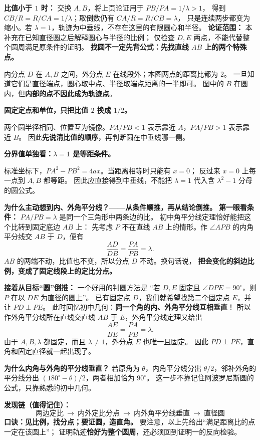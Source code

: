 \begin{explanationbox}
\textbf{比值小于 $1$ 时：} 交换 $A,B$，将上页论证用于 $PB/PA=1/\lambda>1$，
得到 $CB/R=R/CA=1/\lambda$；取倒数仍有 $CA/R=R/CB=\lambda$，
只是连续两步都变为缩小。若 $\lambda=1$，轨迹为中垂线，不存在这里的有限圆心和半径。
\textbf{论证范围：} 本补充在已知直径圆之后解释圆心与半径的比例；
仅检查 $D,E$ 两点，不能代替整个圆周满足原条件的证明。
\tcbbreak
\textbf{找圆不一定先背公式：先找直线 $AB$ 上的两个特殊点。}

内分点 $D$ 在 $A,B$ 之间，外分点 $E$ 在线段外；本图两点的距离比都为 $2$。
一旦知道它们是直径端点，圆心取中点、半径取端点距离的一半即可。
图中的 $B$ 在圆内，但\textbf{内部的点不因此成为轨迹点}。

\tcbbreak
\textbf{固定定点和单位，只把比值 $2$ 换成 $1/2$。}

两个圆半径相同、位置互为镜像。$PA/PB<1$ 表示靠近 $A$，$PA/PB>1$ 表示靠近 $B$。
因此\textbf{先说清比值的顺序}，再判断圆在中垂线哪一侧。

\tcbbreak
\textbf{分界值单独看：$\lambda=1$ 是等距条件。}

标准坐标下，$PA^2-PB^2=4ax$。当距离相等时只能有 $x=0$；
反过来 $x=0$ 上每一点到 $A,B$ 都等距。
因此应直接得到中垂线，不能把 $\lambda=1$ 代入含 $\lambda^2-1$ 分母的圆公式。

\tcbbreak
\textbf{为什么主动想到内、外角平分线？——从条件顺推，再从结论倒推。}
\textbf{第一眼看条件：} $PA/PB=\lambda$ 是同一个三角形中两条边的比。
初中角平分线定理恰好能把这个比转到固定底边 $AB$ 上：
先考虑 $P$ 不在直线 $AB$ 上的情形。作 $\angle APB$ 的内角平分线交 $AB$ 于 $D$，便有
\[
 \frac{AD}{DB}=\frac{PA}{PB}=\lambda.
\]
$AB$ 的两端不动，比值也不变，所以分点 $D$ 不动。换句话说，
\textbf{把会变化的斜边比例，变成了固定线段上的定比分点。}

\textbf{接着从目标“圆”倒推：} 一个好用的判圆方法是
“若 $D,E$ 固定且 $\angle DPE=90^\circ$，则 $P$ 在以 $DE$ 为直径的圆上”。
已有固定点 $D$，我们就希望找第二个固定点 $E$，并让 $PD\perp PE$。
此时回忆初中几何：\textbf{同一个角的内、外角平分线互相垂直}！
所以作外角平分线所在直线交直线 $AB$ 于 $E$，外角平分线定理又给出
\[
 \frac{AE}{BE}=\frac{PA}{PB}=\lambda.
\]
由于 $A,B,\lambda$ 都固定，而且 $\lambda\ne1$，外分点 $E$ 也唯一且固定。
因此 $PD\perp PE$，直角和固定直径就一起出现了。

\textbf{为什么内角与外角的平分线垂直？}
若原角为 $\theta$，内角平分线分出 $\theta/2$，邻补外角的平分线分出
$(180^\circ-\theta)/2$，两者相加恰为 $90^\circ$。
这一步不靠记住阿波罗尼斯圆的公式，只靠熟悉的初中几何。

\textbf{发现链（值得记住）：}
\[
 \boxed{\text{两边定比}\ \longrightarrow\ \text{内外定比分点}\
 \longrightarrow\ \text{内外角平分线垂直}\ \longrightarrow\ \text{直径圆}}
\]
\textbf{口诀：见比例，找分点；要证圆，造直角。}
要注意，以上先给出“满足距离比的点一定在该圆上”；
证明轨迹\textbf{恰好为整个圆周}，还必须回到证明一的反向检验。
\end{explanationbox}
